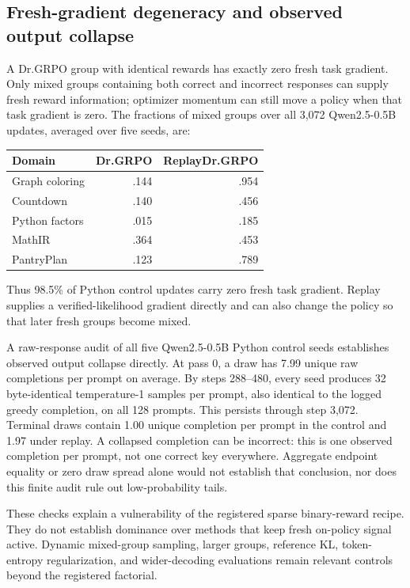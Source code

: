 \subsection{Fresh-gradient degeneracy and observed output collapse}
\label{app:degenerate-groups}

A Dr.GRPO group with identical rewards has exactly zero fresh task gradient.
Only mixed groups containing both correct and incorrect responses can
supply fresh reward information; optimizer momentum can still move a
policy when that task gradient is zero. The fractions of mixed groups
over all 3,072 Qwen2.5-0.5B updates, averaged over five seeds, are:

\begin{center}
\small
\begin{tabular}{@{}lrr@{}}
\toprule
\textbf{Domain} & \textbf{Dr.GRPO} & \textbf{ReplayDr.GRPO} \\
\midrule
Graph coloring & .144 & .954 \\
Countdown & .140 & .456 \\
Python factors & .015 & .185 \\
MathIR & .364 & .453 \\
PantryPlan & .123 & .789 \\
\bottomrule
\end{tabular}
\end{center}

Thus 98.5\% of Python control updates carry zero fresh task gradient.
Replay supplies a verified-likelihood gradient directly and can also
change the policy so that later fresh groups become mixed.

A raw-response audit of all five Qwen2.5-0.5B Python control seeds establishes
observed output collapse directly. At pass 0, a draw has 7.99 unique raw
completions per prompt on average. By steps 288--480, every seed produces
32 byte-identical temperature-1 samples per prompt, also identical to the
logged greedy completion, on all 128 prompts. This persists through step
3,072. Terminal draws contain 1.00 unique completion per prompt in the
control and 1.97 under replay. A collapsed completion can be incorrect:
this is one observed completion per prompt, not one correct key everywhere.
Aggregate endpoint equality or zero draw spread alone would not establish
that conclusion, nor does this finite audit rule out low-probability tails.

These checks explain a vulnerability of the registered sparse binary-reward
recipe. They do not establish dominance over methods that keep fresh
on-policy signal active. Dynamic mixed-group sampling, larger groups,
reference KL, token-entropy regularization, and wider-decoding evaluations
remain relevant controls beyond the registered factorial.

